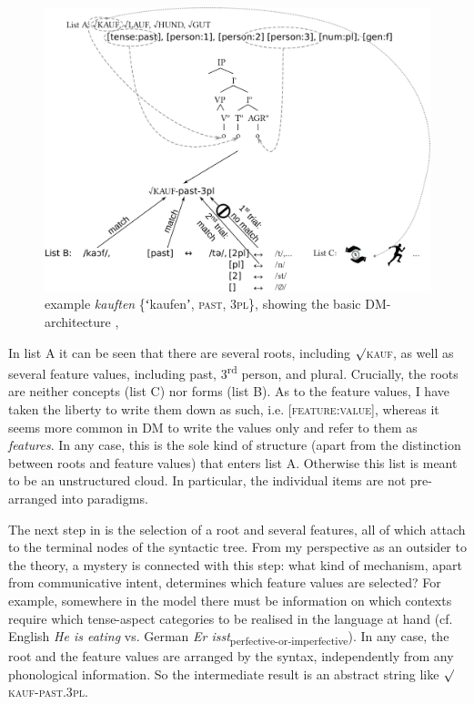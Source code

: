 \documentclass[output=paper]{langsci/langscibook}
\begin{document}
\begin{figure}
\includegraphics[width=\textwidth]{figures/Reiner3.pdf}
\caption{example \textit{kauften} \{ʻkaufenʼ, \textsc{past}, 3\textsc{pl}\}, showing the basic DM-architecture \citet[6]{Bobaljik2017}, \citet[248--250]{AlbrightAlbright2012}}
\label{fig:reiner:3}
\end{figure}

In list A it can be seen that there are several roots, including ${\surd}$\textsc{kauf}, as well as several feature values, including past, 3\textsuperscript{rd} person, and plural. Crucially, the roots are neither concepts (list C) nor forms (list B). As to the feature values, I have taken the liberty to write them down as such, i.e. [\textsc{feature}:\textsc{value}], whereas it seems more common in DM to write the values only and refer to them as \textit{features}. In any case, this is the sole kind of structure (apart from the distinction between roots and feature values) that enters list A. Otherwise this list is meant to be an unstructured cloud. In particular, the individual items are not pre-arranged into paradigms.

The next step in  is the selection of a root and several features, all of which attach to the terminal nodes of the syntactic tree. From my perspective as an outsider to the theory, a mystery is connected with this step: what kind of mechanism, apart from communicative intent, determines which feature values are selected? For example, somewhere in the model there must be information on which contexts require which tense-aspect categories to be realised in the language at hand (cf. English \textit{He is eating} vs. German \textit{Er isst}\textsubscript{perfective-or-imperfective}). In any case, the root and the feature values are arranged by the syntax, independently from any phonological information. So the intermediate result is an abstract string like ${\surd}$\textsc{kauf}-\textsc{past}.3\textsc{pl}.
\end{document}
